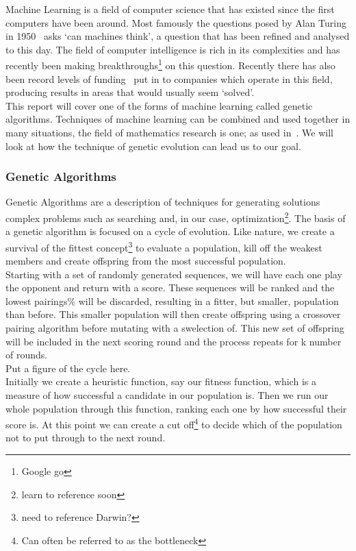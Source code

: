 Machine Learning is a field of computer science that has existed since the first computers have been around.
Most famously the questions posed by Alan Turing in 1950~\cite{turing1950computing} asks `can machines think', a question that has been refined and analysed to this day.
The field of computer intelligence is rich in its complexities and has recently been making breakthroughs\footnote{Google go} on this question.
Recently there has also been record levels of funding~\cite{chui2017artificial} put in to companies which operate in this field, producing results in areas that would usually seem `solved'.\\

This report will cover one of the forms of machine learning called genetic algorithms.
Techniques of machine learning can be combined and used together in many situations, the field of mathematics research is one;
as used in~\cite{chu1997genetic}.
We will look at how the technique of genetic evolution can lead us to our goal.

\subsubsection{Genetic Algorithms}\label{subsubsec:geneticAlgorithms}
Genetic Algorithms are a description of techniques for generating solutions complex problems such as searching and, in our case, optimization\footnote{ learn to reference soon}.
The basis of a genetic algorithm is focused on a cycle of evolution.
Like nature, we create a survival of the fittest concept\footnote{need to reference Darwin?} to evaluate a population, kill off the weakest members and create offspring from the most successful population.\\

Starting with a set of randomly generated sequences, we will have each one play the opponent and return with a score.
These sequences will be ranked and the lowest pairings\% will be discarded, resulting in a fitter, but smaller, population than before.
This smaller population will then create offspring using a crossover pairing algorithm before mutating with a swelection of.
This new set of offspring will be included in the next scoring round and the process repeats for k number of rounds.\\

Put a figure of the cycle here.\label{fig:genetic algo cycle} \\

Initially we create a heuristic function, say our fitness function, which is a measure of how successful a candidate in our population is.
Then we run our whole population through this function, ranking each one by how successful their score is.
At this point we can create a cut off\footnote{Can often be referred to as the bottleneck} to decide which of the population not to put through to the next round.\\

